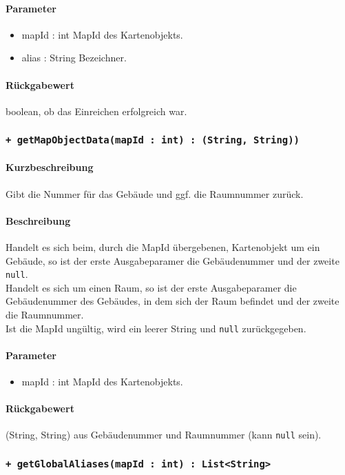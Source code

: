 \paragraph*{Parameter}
\begin{itemize}
    \item mapId : int MapId des Kartenobjekts.
    \item alias : String Bezeichner.
\end{itemize}
\paragraph*{Rückgabewert}
boolean, ob das Einreichen erfolgreich war.

\subsubsection*{\texttt{+ getMapObjectData(mapId : int) : (String, String))}}%
\paragraph*{Kurzbeschreibung}
Gibt die Nummer für das Gebäude und ggf. die Raumnummer zurück.
\paragraph*{Beschreibung}
Handelt es sich beim, durch die MapId übergebenen, Kartenobjekt um ein Gebäude, 
so ist der erste Ausgabeparamer die Gebäudenummer und der zweite \texttt{null}.\\
Handelt es sich um einen Raum, so ist der erste Ausgabeparamer die Gebäudenummer des Gebäudes, 
in dem sich der Raum befindet und der zweite die Raumnummer.\\
Ist die MapId ungültig, wird ein leerer String und \texttt{null} zurückgegeben.
\paragraph*{Parameter}
\begin{itemize}
    \item mapId : int MapId des Kartenobjekts.
\end{itemize}
\paragraph*{Rückgabewert}
(String, String) aus Gebäudenummer und Raumnummer (kann \texttt{null} sein).

\subsubsection*{\texttt{+ getGlobalAliases(mapId : int) : List<String>}}%
